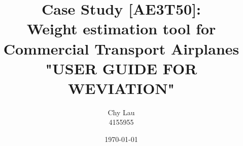 \documentclass[10pt]{article}
\begin{document}
\title{\textbf{Case Study [AE3T50]: \\Weight estimation tool for Commercial Transport Airplanes\\ "USER GUIDE FOR WEVIATION"}}
\date{\today}
\author{Chy Lau\\ 4155955}
\maketitle
\thispagestyle{empty}
\clearpage

\tableofcontents
\thispagestyle{empty}
\clearpage
\setcounter{page}{1}

 \clearpage
 \clearpage

%
%
% 
\end{document}
